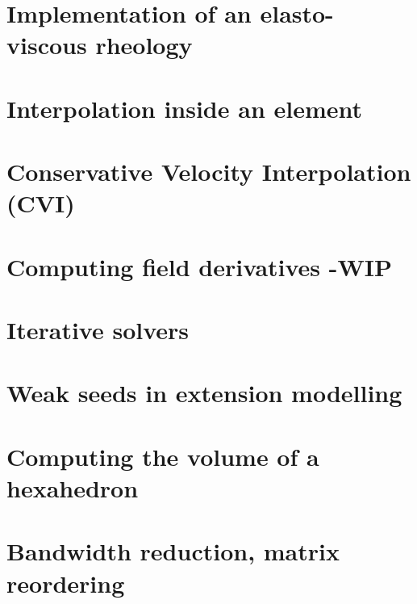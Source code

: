 \section{Implementation of an elasto-viscous rheology} \label{ss:evrheo}  %
\newpage %
\section{Interpolation inside an element} \label{ss:bern}  %
\newpage %
\section{Conservative Velocity Interpolation (CVI)} \label{sec:cvi} %
\newpage %
\section{Computing field derivatives -WIP} \label{ss:nodderiv}  %
\newpage %
\section{Iterative solvers \label{ss:itsolvers}}  %
\newpage %
\section{Weak seeds in extension modelling \label{ss:weakseeds}}  %
\newpage %
\section{Computing the volume of a hexahedron}  %
\newpage %
\section{Bandwidth reduction, matrix reordering}  %
\newpage %
